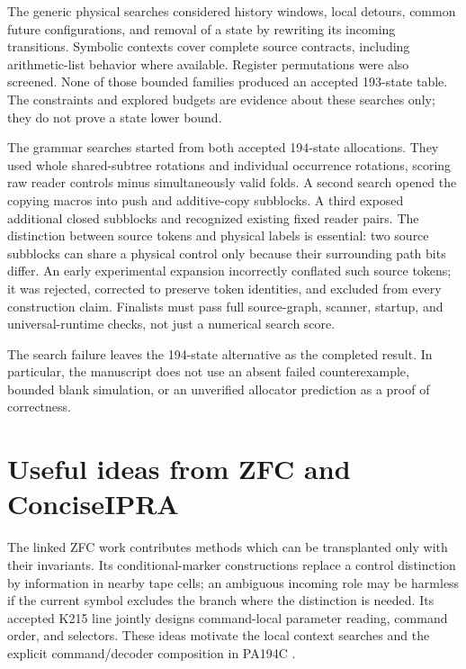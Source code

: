 \documentclass[11pt]{article}
\theoremstyle{definition}
\theoremstyle{remark}
\begin{document}


The generic physical searches considered history windows, local detours,
common future configurations, and removal of a state by rewriting its
incoming transitions. Symbolic contexts cover complete source contracts,
including arithmetic-list behavior where available. Register permutations
were also screened. None of those bounded families produced an accepted
193-state table. The constraints and explored budgets are evidence about
these searches only; they do not prove a state lower bound.

The grammar searches started from both accepted 194-state allocations.
They used whole shared-subtree rotations and individual occurrence
rotations, scoring raw reader controls minus simultaneously valid folds.
A second search opened the copying macros into push and additive-copy
subblocks. A third exposed additional closed subblocks and recognized
existing fixed reader pairs. The distinction between source tokens and
physical labels is essential: two source subblocks can share a physical
control only because their surrounding path bits differ. An early
experimental expansion incorrectly conflated such source tokens; it was
rejected, corrected to preserve token identities, and excluded from every
construction claim. Finalists must pass full source-graph, scanner,
startup, and universal-runtime checks, not just a numerical search score.

The search failure leaves the 194-state alternative as the completed
result. In particular, the manuscript does not use an absent failed
counterexample, bounded blank simulation, or an unverified allocator
prediction as a proof of correctness.

\section{Useful ideas from ZFC and ConciseIPRA}

The linked ZFC work contributes methods which can be transplanted only
with their invariants. Its conditional-marker constructions replace a
control distinction by information in nearby tape cells; an ambiguous
incoming role may be harmless if the current symbol excludes the branch
where the distinction is needed. Its accepted K215 line jointly designs
command-local parameter reading, command order, and selectors. These ideas
motivate the local context searches and the explicit command/decoder
composition in PA194C \cite{zfcmarker,zfc215}.
\end{document}
